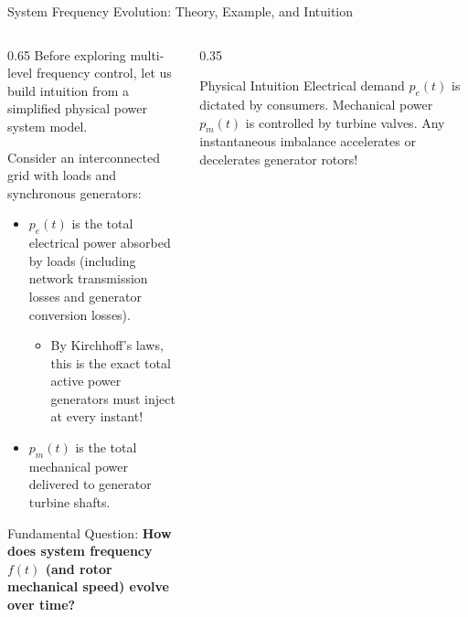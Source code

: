 \begin{frame}{System Frequency Evolution: Theory, Example, and Intuition}
\begin{columns}[T]
\begin{column}{0.65\textwidth}
    \footnotesize
    Before exploring multi-level frequency control, let us build intuition from a simplified physical power system model.
    \vspace{0.1cm}
    
    Consider an interconnected grid with loads and synchronous generators:
    \begin{itemize}\setlength{\itemsep}{2pt}
        \item $p_e(t)$ is the total electrical power absorbed by loads (including network transmission losses and generator conversion losses).
        \begin{itemize}
            \item By Kirchhoff's laws, this is the exact total active power generators must inject at every instant!
        \end{itemize}
        \item $p_m(t)$ is the total mechanical power delivered to generator turbine shafts.
    \end{itemize}
    \vspace{0.1cm}
    \alert{Fundamental Question:} \textbf{How does system frequency $f(t)$ (and rotor mechanical speed) evolve over time?}
\end{column}
\begin{column}{0.35\textwidth}
    \begin{block}{Physical Intuition}
    \scriptsize
    Electrical demand $p_e(t)$ is dictated by consumers. Mechanical power $p_m(t)$ is controlled by turbine valves. Any instantaneous imbalance accelerates or decelerates generator rotors!
    \end{block}
\end{column}
\end{columns}
\end{frame}

